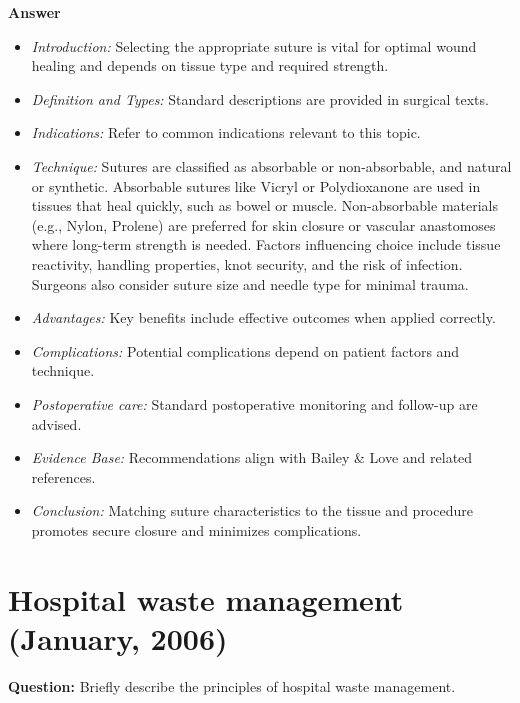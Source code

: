 \documentclass{article}
\begin{document}
\textbf{Answer}
\begin{itemize}

\item \emph{Introduction:} Selecting the appropriate suture is vital for optimal wound healing and depends on tissue type and required strength.
\item \emph{Definition and Types:} Standard descriptions are provided in surgical texts.
\item \emph{Indications:} Refer to common indications relevant to this topic.

\item \emph{Technique:} Sutures are classified as absorbable or non-absorbable, and natural or synthetic. Absorbable sutures like Vicryl or Polydioxanone are used in tissues that heal quickly, such as bowel or muscle. Non-absorbable materials (e.g., Nylon, Prolene) are preferred for skin closure or vascular anastomoses where long-term strength is needed. Factors influencing choice include tissue reactivity, handling properties, knot security, and the risk of infection. Surgeons also consider suture size and needle type for minimal trauma.
\item \emph{Advantages:} Key benefits include effective outcomes when applied correctly.
\item \emph{Complications:} Potential complications depend on patient factors and technique.
\item \emph{Postoperative care:} Standard postoperative monitoring and follow-up are advised.
\item \emph{Evidence Base:} Recommendations align with Bailey \& Love and related references.

\item \emph{Conclusion:} Matching suture characteristics to the tissue and procedure promotes secure closure and minimizes complications.


\end{itemize}

\section{Hospital waste management (January, 2006)}

\textbf{Question:} Briefly describe the principles of hospital waste management.
\end{document}
